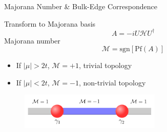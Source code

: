 \documentclass[xcolor=dvipsnames,10pt,aspectratio=169]{beamer}
\newcommand{\ham}{\mathcal{H}}
\begin{document}
  \begin{frame}{Majorana Number \& Bulk-Edge Correspondence}

    Transform to Majorana basis
    \begin{equation}
      A = -i U \ham U^{\dagger}
    \end{equation}
    Majorana number
    \begin{equation}
      \mathcal{M} = \text{sgn}[\text{Pf}(A)]
    \end{equation}


    \begin{itemize}
      \item If $|\mu| > 2t$, $\mathcal{M} = +1$, trivial topology
      \item If $|\mu| < 2t$, $\mathcal{M} = -1$, non-trivial topology
    \end{itemize}
    \pause

    \begin{figure}
      \includegraphics[width = 0.6\textwidth]{./figures/bulk-edge.pdf}
    \end{figure}


  \end{frame}
\end{document}
